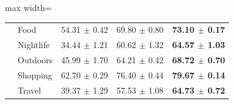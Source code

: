 \begin{table}[htbp]
\begin{adjustbox}{max width=\textwidth}
\begin{tabular}{clccc}
 & Food & 54.31 $\pm$ 0.42 & 69.80 $\pm$ 0.80 & \textbf{73.10 $\pm$ 0.17} \\
 & Nightlife & 34.44 $\pm$ 1.21 & 60.62 $\pm$ 1.32 & \textbf{64.57 $\pm$ 1.03} \\
 & Outdoors & 45.99 $\pm$ 1.70 & 64.21 $\pm$ 0.42 & \textbf{68.72 $\pm$ 0.70} \\
 & Shopping & 62.70 $\pm$ 0.29 & 76.40 $\pm$ 0.44 & \textbf{79.67 $\pm$ 0.14} \\
 & Travel & 39.37 $\pm$ 1.29 & 57.53 $\pm$ 1.08 & \textbf{64.73 $\pm$ 0.72} \\
\bottomrule
\end{tabular}
\end{adjustbox}
\end{table}
